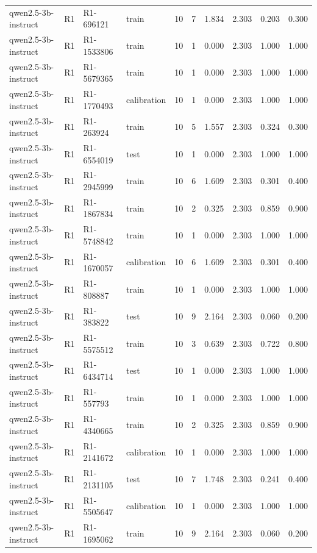 \begin{table}
\begin{tabular}{llllrrrrrr}
qwen2.5-3b-instruct & R1 & R1-696121 & train & 10 & 7 & 1.834 & 2.303 & 0.203 & 0.300 \\
qwen2.5-3b-instruct & R1 & R1-1533806 & train & 10 & 1 & 0.000 & 2.303 & 1.000 & 1.000 \\
qwen2.5-3b-instruct & R1 & R1-5679365 & train & 10 & 1 & 0.000 & 2.303 & 1.000 & 1.000 \\
qwen2.5-3b-instruct & R1 & R1-1770493 & calibration & 10 & 1 & 0.000 & 2.303 & 1.000 & 1.000 \\
qwen2.5-3b-instruct & R1 & R1-263924 & train & 10 & 5 & 1.557 & 2.303 & 0.324 & 0.300 \\
qwen2.5-3b-instruct & R1 & R1-6554019 & test & 10 & 1 & 0.000 & 2.303 & 1.000 & 1.000 \\
qwen2.5-3b-instruct & R1 & R1-2945999 & train & 10 & 6 & 1.609 & 2.303 & 0.301 & 0.400 \\
qwen2.5-3b-instruct & R1 & R1-1867834 & train & 10 & 2 & 0.325 & 2.303 & 0.859 & 0.900 \\
qwen2.5-3b-instruct & R1 & R1-5748842 & train & 10 & 1 & 0.000 & 2.303 & 1.000 & 1.000 \\
qwen2.5-3b-instruct & R1 & R1-1670057 & calibration & 10 & 6 & 1.609 & 2.303 & 0.301 & 0.400 \\
qwen2.5-3b-instruct & R1 & R1-808887 & train & 10 & 1 & 0.000 & 2.303 & 1.000 & 1.000 \\
qwen2.5-3b-instruct & R1 & R1-383822 & test & 10 & 9 & 2.164 & 2.303 & 0.060 & 0.200 \\
qwen2.5-3b-instruct & R1 & R1-5575512 & train & 10 & 3 & 0.639 & 2.303 & 0.722 & 0.800 \\
qwen2.5-3b-instruct & R1 & R1-6434714 & test & 10 & 1 & 0.000 & 2.303 & 1.000 & 1.000 \\
qwen2.5-3b-instruct & R1 & R1-557793 & train & 10 & 1 & 0.000 & 2.303 & 1.000 & 1.000 \\
qwen2.5-3b-instruct & R1 & R1-4340665 & train & 10 & 2 & 0.325 & 2.303 & 0.859 & 0.900 \\
qwen2.5-3b-instruct & R1 & R1-2141672 & calibration & 10 & 1 & 0.000 & 2.303 & 1.000 & 1.000 \\
qwen2.5-3b-instruct & R1 & R1-2131105 & test & 10 & 7 & 1.748 & 2.303 & 0.241 & 0.400 \\
qwen2.5-3b-instruct & R1 & R1-5505647 & calibration & 10 & 1 & 0.000 & 2.303 & 1.000 & 1.000 \\
qwen2.5-3b-instruct & R1 & R1-1695062 & train & 10 & 9 & 2.164 & 2.303 & 0.060 & 0.200 \\

\end{tabular}
\end{table}
